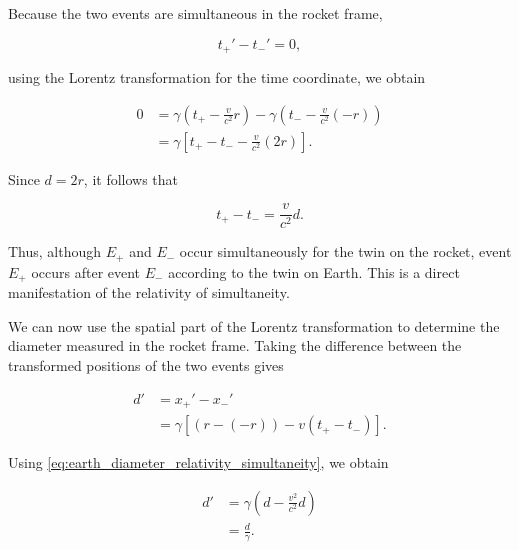 \documentclass[12pt]{article}
\begin{document}
Because the two events are simultaneous in the rocket frame,

\[
  t_+'-t_-'=0,
\]

using the Lorentz transformation for the time coordinate, we obtain

\begin{equation}
  \begin{aligned}
    0
    &=
    \gamma\left(
      t_+-\frac{v}{c^2}r
    \right)
    -
    \gamma\left(
      t_- -\frac{v}{c^2}(-r)
    \right)
    \\
    &=
    \gamma\left[
      t_+-t_-
      -
      \frac{v}{c^2}(2r)
    \right].
  \end{aligned}
\end{equation}

Since $d=2r$, it follows that

\begin{equation}
  t_+-t_-=\frac{v}{c^2}d.
  \label{eq:earth_diameter_relativity_simultaneity}
\end{equation}

Thus, although $E_+$ and $E_-$ occur simultaneously for the twin on the rocket,
event $E_+$ occurs after event $E_-$ according to the twin on Earth. This is a direct
manifestation of the relativity of simultaneity. \par

We can now use the spatial part of the Lorentz transformation to determine the diameter
measured in the rocket frame. Taking the difference between the transformed positions
of the two events gives

\begin{equation}
  \begin{aligned}
    d'
    &=
    x_+'-x_-'
    \\
    &=
    \gamma\left[
      (r-(-r))-v(t_+-t_-)
    \right].
  \end{aligned}
\end{equation}

Using \eqref{eq:earth_diameter_relativity_simultaneity}, we obtain

\begin{equation}
  \begin{aligned}
    d'
    &=
    \gamma\left(
      d-\frac{v^2}{c^2}d
    \right)
    \\
    &=
    \frac{d}{\gamma}.
  \end{aligned}
  \label{eq:length_contraction_example}
\end{equation}
\end{document}
